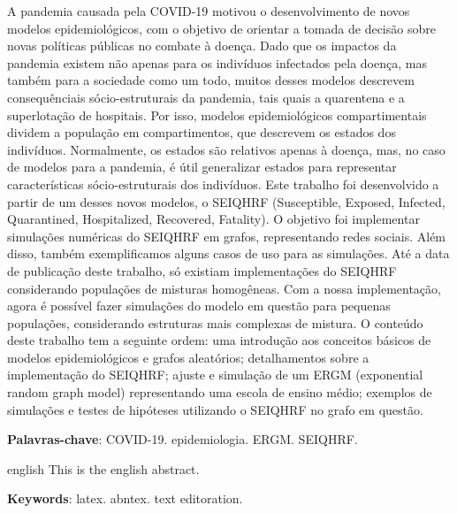 \setlength{\absparsep}{18pt} %
\begin{resumo}
  A pandemia causada pela COVID-19 motivou o desenvolvimento de novos modelos 
  epidemiológicos, com o objetivo de orientar a tomada de decisão sobre novas 
  políticas públicas no combate à doença.
  Dado que os impactos da pandemia existem não apenas para os indivíduos 
  infectados pela doença, mas também para a sociedade como um todo, 
  muitos desses modelos descrevem consequênciais sócio-estruturais 
  da pandemia, tais quais a quarentena e a superlotação de hospitais.
  Por isso, modelos epidemiológicos compartimentais dividem a população em 
  compartimentos, que descrevem os estados dos indivíduos. Normalmente, os 
  estados são relativos apenas à doença, mas, no caso de modelos para a 
  pandemia, é útil generalizar estados para representar características 
  sócio-estruturais dos indivíduos.
  Este trabalho foi desenvolvido a partir de um desses novos modelos, o 
  SEIQHRF (Susceptible, Exposed, Infected, Quarantined, Hospitalized, 
  Recovered, Fatality). O objetivo foi implementar simulações numéricas do 
  SEIQHRF em grafos, representando redes sociais.
  Além disso, também exemplificamos alguns casos de uso para as simulações.
  Até a data de publicação deste trabalho, só existiam implementações do 
  SEIQHRF considerando populações de misturas homogêneas. 
  Com a nossa implementação, agora é possível fazer simulações do modelo 
  em questão para pequenas populações, considerando estruturas mais complexas 
  de mistura.
  O conteúdo deste trabalho tem a seguinte ordem: 
  uma introdução aos conceitos básicos de modelos epidemiológicos e 
  grafos aleatórios; detalhamentos sobre a implementação do SEIQHRF; 
  ajuste e simulação de um ERGM (exponential random graph model) 
  representando uma escola de ensino médio; exemplos de simulações e 
  testes de hipóteses utilizando o SEIQHRF no grafo em questão.

   \vspace{\onelineskip}
 
   \noindent 
   \textbf{Palavras-chave}: COVID-19. epidemiologia. ERGM. SEIQHRF.
\end{resumo}

\begin{resumo}[Abstract]
 \begin{otherlanguage*}{english}
   This is the english abstract.

   \vspace{\onelineskip}
 
   \noindent 
   \textbf{Keywords}: latex. abntex. text editoration.
 \end{otherlanguage*}
\end{resumo}

